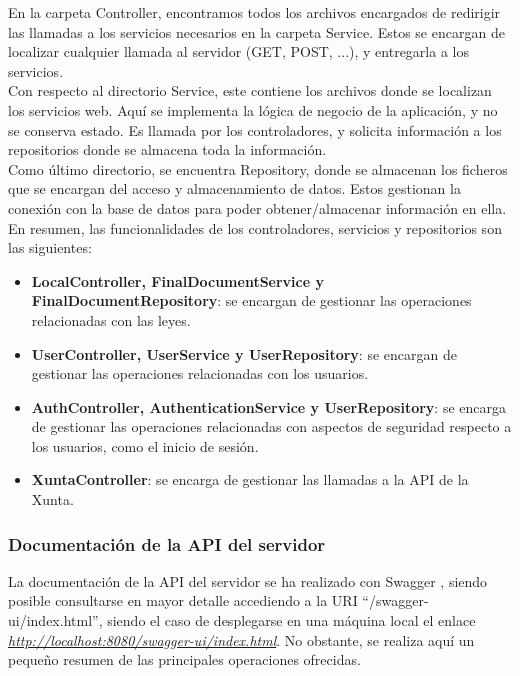 En la carpeta Controller, encontramos todos los archivos encargados de redirigir las llamadas a los servicios necesarios en la carpeta Service. Estos se encargan de localizar cualquier llamada al servidor (GET, POST, ...), y entregarla a los servicios.
\\

Con respecto al directorio Service, este contiene los archivos donde se localizan los servicios web. Aquí se implementa la lógica de negocio de la aplicación, y no se conserva estado. Es llamada por los controladores, y solicita información a los repositorios donde se almacena toda la información.
\\

Como último directorio, se encuentra Repository, donde se almacenan los ficheros que se encargan del acceso y almacenamiento de datos. Estos gestionan la conexión con la base de datos para poder obtener/almacenar información en ella.
\\

En resumen, las funcionalidades de los controladores, servicios y repositorios son las siguientes:
\begin{itemize}
    \item {\bf LocalController, FinalDocumentService y FinalDocumentRepository}: se encargan de gestionar las operaciones relacionadas con las leyes.
    \item {\bf UserController, UserService y UserRepository}: se encargan de gestionar las operaciones relacionadas con los usuarios.
    \item {\bf AuthController, AuthenticationService y UserRepository}: se encarga de gestionar las operaciones relacionadas con aspectos de seguridad respecto a los usuarios, como el inicio de sesión.
    \item {\bf XuntaController}: se encarga de gestionar las llamadas a la API de la Xunta.
\end{itemize}

\subsubsection{Documentación de la API del servidor}

La documentación de la API del servidor se ha realizado con Swagger \cite{swagger}, siendo posible consultarse en mayor detalle accediendo a la URI ``/swagger-ui/index.html'', siendo el caso de desplegarse en una máquina local el enlace {\it \url{http://localhost:8080/swagger-ui/index.html}}. No obstante, se realiza aquí un pequeño resumen de las principales operaciones ofrecidas.

